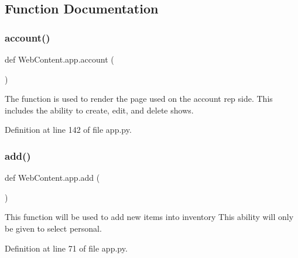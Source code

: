\subsection{Function Documentation}
\mbox{\label{namespace_web_content_1_1app_afe68584aa29f9b47108d88d14650c05f}} 
\subsubsection{\texorpdfstring{account()}{account()}}
{\footnotesize\ttfamily def Web\+Content.\+app.\+account (\begin{DoxyParamCaption}{ }\end{DoxyParamCaption})}

\begin{DoxyVerb}The function is used to render the page used
on the account rep side.
This includes the ability to create, edit, and delete shows.
\end{DoxyVerb}
 

Definition at line 142 of file app.\+py.

\mbox{\label{namespace_web_content_1_1app_a01e890f5f74756a5e0db012e87a3bb32}} 
\subsubsection{\texorpdfstring{add()}{add()}}
{\footnotesize\ttfamily def Web\+Content.\+app.\+add (\begin{DoxyParamCaption}{ }\end{DoxyParamCaption})}

\begin{DoxyVerb}This function will be used to add new items into inventory
This ability will only be given to select personal.
\end{DoxyVerb}
 

Definition at line 71 of file app.\+py.

\mbox{\label{namespace_web_content_1_1app_a32b908258de025be7473e15954f4683c}} 
